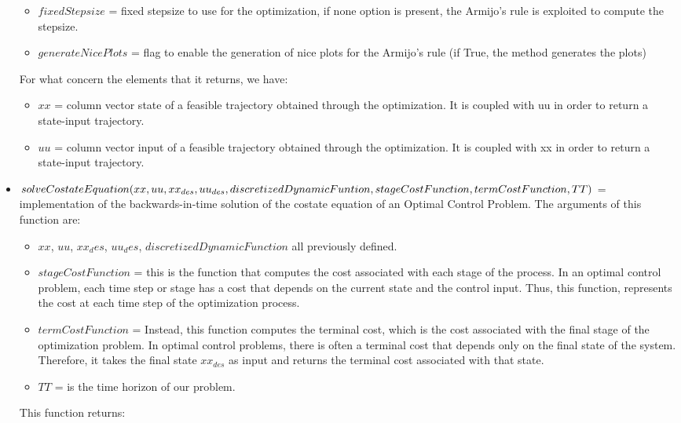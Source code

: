 \documentclass[a4paper,11pt,oneside]{book}
\begin{document}
\begin{itemize}
\begin{itemize}
        \item $fixedStepsize$ = fixed stepsize to use for the optimization, if none option is present, the Armijo's rule is exploited to compute the stepsize.
        \item $generateNicePlots$ = flag to enable the generation of nice plots for the Armijo's rule (if True, the method generates the plots)
    \end{itemize}
    For what concern the elements that it returns, we have:
    \begin{itemize}
        \item $xx$ = column vector state of a feasible trajectory obtained through the optimization. It is coupled with uu in order to return a state-input trajectory.
        \item $uu$ = column vector input of a feasible trajectory obtained through the optimization. It is coupled with xx in order to return a state-input trajectory.
    \end{itemize}
    \item $solveCostateEquation(xx, uu, xx_{des}, uu_{des}, discretizedDynamicFuntion,\\ stageCostFunction, termCostFunction, TT)$ = implementation of the backwards-in-time solution of the costate equation of an Optimal Control Problem. The arguments of this function are:
    \begin{itemize}
        \item $xx$, $uu$, $xx_des$, $uu_des$, $discretizedDynamicFunction$ all previously defined.
        \item $stageCostFunction$ = this is the function that computes the cost associated with each stage of the process. In an optimal control problem, each time step or stage has a cost that depends on the current state and the control input. Thus, this function, represents the cost at each time step of the optimization process.
        \item $termCostFunction$ = Instead, this function computes the terminal cost, which is the cost associated with the final stage of the optimization problem. In optimal control problems, there is often a terminal cost that depends only on the final state of the system. Therefore, it takes the final state $xx_{des}$ as input and returns the terminal cost associated with that state.
        \item $TT$ = is the time horizon of our problem.
    \end{itemize}
    This function returns:
    \begin{itemize}

\end{itemize}
\end{itemize}
\end{document}

